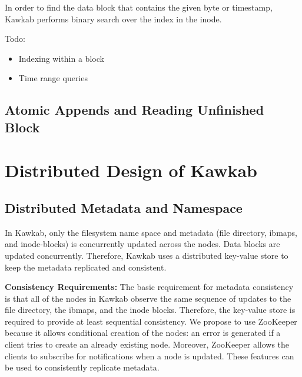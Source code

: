 \documentclass[]{article}
\newcommand{\subtopic}[1]{\vspace{1.5pt} \noindent \textbf{#1}}
\begin{document}
In order to find the data block that contains the given byte or timestamp, Kawkab
performs binary search over the index in the inode.

Todo:

\begin{itemize}
  \item Indexing within a block
  \item Time range queries
\end{itemize}


\subsection{Atomic Appends and Reading Unfinished Block}


\section{Distributed Design of Kawkab}

\subsection{Distributed Metadata and Namespace}

In Kawkab, only the filesystem name space and metadata (file directory, ibmaps,
and inode-blocks) is concurrently updated across the nodes. Data blocks are
updated concurrently. Therefore, Kawkab uses a distributed key-value store to
keep the metadata replicated and consistent.

\subtopic{Consistency Requirements:} The basic requirement for metadata
consistency is that all of the nodes in Kawkab observe the same sequence of
updates to the file directory, the ibmaps, and the inode blocks.  
Therefore, the key-value store is required to provide at least sequential
consistency.
We propose to use ZooKeeper because it allows conditional creation of the nodes:
an error is generated if a client tries to create an already existing node. Moreover,
ZooKeeper allows the clients to subscribe for notifications when a node is updated.
These features can be used to consistently replicate metadata.
\end{document}
